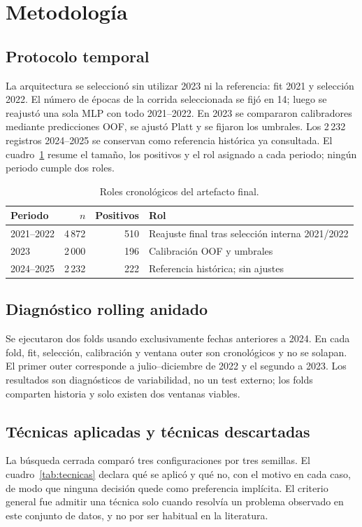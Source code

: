\section{Metodología}\label{sec:metodologia}

\subsection{Protocolo temporal}
La arquitectura se seleccionó sin utilizar 2023 ni la referencia: fit 2021 y selección 2022. El número de épocas de la corrida seleccionada se fijó en 14; luego se reajustó una sola MLP con todo 2021--2022. En 2023 se compararon calibradores mediante predicciones OOF, se ajustó Platt y se fijaron los umbrales. Los 2\,232 registros 2024--2025 se conservan como referencia histórica ya consultada. El cuadro~\ref{tab:roles-cronologicos} resume el tamaño, los positivos y el rol asignado a cada periodo; ningún periodo cumple dos roles.

\begin{table}[H]\centering\caption{Roles cronológicos del artefacto final.}\label{tab:roles-cronologicos}\begin{tabular}{lrrl}\toprule
Periodo & $n$ & Positivos & Rol \\\midrule
2021--2022 & 4\,872 & 510 & Reajuste final tras selección interna 2021/2022 \\
2023 & 2\,000 & 196 & Calibración OOF y umbrales \\
2024--2025 & 2\,232 & 222 & Referencia histórica; sin ajustes \\\bottomrule
\end{tabular}\end{table}

\subsection{Diagnóstico rolling anidado}
Se ejecutaron dos folds usando exclusivamente fechas anteriores a 2024. En cada fold, fit, selección, calibración y ventana outer son cronológicos y no se solapan. El primer outer corresponde a julio--diciembre de 2022 y el segundo a 2023. Los resultados son diagnósticos de variabilidad, no un test externo; los folds comparten historia y solo existen dos ventanas viables.

\subsection{Técnicas aplicadas y técnicas descartadas}
La búsqueda cerrada comparó tres configuraciones por tres semillas. El cuadro~\ref{tab:tecnicas} declara qué se aplicó y qué no, con el motivo en cada caso, de modo que ninguna decisión quede como preferencia implícita. El criterio general fue admitir una técnica solo cuando resolvía un problema observado en este conjunto de datos, y no por ser habitual en la literatura.

